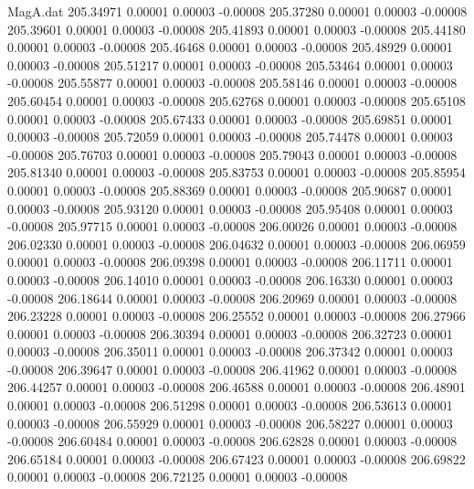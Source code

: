 \begin{filecontents}{MagA.dat}
 205.34971    0.00001    0.00003   -0.00008
 205.37280    0.00001    0.00003   -0.00008
 205.39601    0.00001    0.00003   -0.00008
 205.41893    0.00001    0.00003   -0.00008
 205.44180    0.00001    0.00003   -0.00008
 205.46468    0.00001    0.00003   -0.00008
 205.48929    0.00001    0.00003   -0.00008
 205.51217    0.00001    0.00003   -0.00008
 205.53464    0.00001    0.00003   -0.00008
 205.55877    0.00001    0.00003   -0.00008
 205.58146    0.00001    0.00003   -0.00008
 205.60454    0.00001    0.00003   -0.00008
 205.62768    0.00001    0.00003   -0.00008
 205.65108    0.00001    0.00003   -0.00008
 205.67433    0.00001    0.00003   -0.00008
 205.69851    0.00001    0.00003   -0.00008
 205.72059    0.00001    0.00003   -0.00008
 205.74478    0.00001    0.00003   -0.00008
 205.76703    0.00001    0.00003   -0.00008
 205.79043    0.00001    0.00003   -0.00008
 205.81340    0.00001    0.00003   -0.00008
 205.83753    0.00001    0.00003   -0.00008
 205.85954    0.00001    0.00003   -0.00008
 205.88369    0.00001    0.00003   -0.00008
 205.90687    0.00001    0.00003   -0.00008
 205.93120    0.00001    0.00003   -0.00008
 205.95408    0.00001    0.00003   -0.00008
 205.97715    0.00001    0.00003   -0.00008
 206.00026    0.00001    0.00003   -0.00008
 206.02330    0.00001    0.00003   -0.00008
 206.04632    0.00001    0.00003   -0.00008
 206.06959    0.00001    0.00003   -0.00008
 206.09398    0.00001    0.00003   -0.00008
 206.11711    0.00001    0.00003   -0.00008
 206.14010    0.00001    0.00003   -0.00008
 206.16330    0.00001    0.00003   -0.00008
 206.18644    0.00001    0.00003   -0.00008
 206.20969    0.00001    0.00003   -0.00008
 206.23228    0.00001    0.00003   -0.00008
 206.25552    0.00001    0.00003   -0.00008
 206.27966    0.00001    0.00003   -0.00008
 206.30394    0.00001    0.00003   -0.00008
 206.32723    0.00001    0.00003   -0.00008
 206.35011    0.00001    0.00003   -0.00008
 206.37342    0.00001    0.00003   -0.00008
 206.39647    0.00001    0.00003   -0.00008
 206.41962    0.00001    0.00003   -0.00008
 206.44257    0.00001    0.00003   -0.00008
 206.46588    0.00001    0.00003   -0.00008
 206.48901    0.00001    0.00003   -0.00008
 206.51298    0.00001    0.00003   -0.00008
 206.53613    0.00001    0.00003   -0.00008
 206.55929    0.00001    0.00003   -0.00008
 206.58227    0.00001    0.00003   -0.00008
 206.60484    0.00001    0.00003   -0.00008
 206.62828    0.00001    0.00003   -0.00008
 206.65184    0.00001    0.00003   -0.00008
 206.67423    0.00001    0.00003   -0.00008
 206.69822    0.00001    0.00003   -0.00008
 206.72125    0.00001    0.00003   -0.00008

\end{filecontents}
